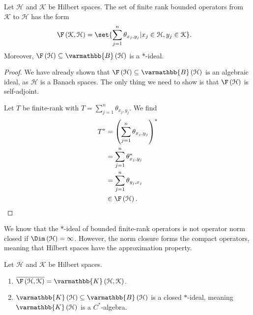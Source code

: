 \documentclass[10pt]{mypackage}
\renewcommand*{\mathbb}[1]{\varmathbb{#1}}
\newcommand{\B}{\mathbb{B}}
\begin{document}
\begin{corollary}
  Let $\mathcal{H}$ and $\mathcal{K}$ be Hilbert spaces. The set of finite rank bounded operators from $\mathcal{K}$ to $\mathcal{H}$ has the form
  \begin{align*}
    \F\left(\mathcal{K},\mathcal{H}\right) &= \set{\sum_{j=1}^{n}\theta_{x_j,y_j} | x_j\in \mathcal{H},y_j\in \mathcal{K}}.
  \end{align*}
  Moreover, $\F\left(\mathcal{H}\right)\subseteq \B\left(\mathcal{H}\right)$ is a $\ast$-ideal.
\end{corollary}
\begin{proof}
  We have already shown that $\F\left(\mathcal{H}\right)\subseteq \B\left(\mathcal{H}\right)$ is an algebraic ideal, as $\mathcal{H}$ is a Banach spaces. The only thing we need to show is that $\F\left(\mathcal{H}\right)$ is self-adjoint.\newline

  Let $T$ be finite-rank with $T = \sum_{j=1}^{n}\theta_{x_j,y_j}$. We find
  \begin{align*}
    T^{\ast} &= \left(\sum_{j=1}^{n}\theta_{x_j,y_j}\right)^{\ast}\\
             &= \sum_{j=1}^{n}\theta_{x_j,y_j}^{\ast}\\
             &= \sum_{j=1}^{n}\theta_{y_j,x_j}\\
             &\in \F\left(\mathcal{H}\right).
  \end{align*}
\end{proof}
We know that the $\ast$-ideal of bounded finite-rank operators is not operator norm closed if $\Dim\left(\mathcal{H}\right) = \infty$. However, the norm closure forms the compact operators, meaning that Hilbert spaces have the approximation property.
\begin{theorem}
  Let $\mathcal{H}$ and $\mathcal{K}$ be Hilbert spaces.
  \begin{enumerate}[(1)]
    \item $\overline{\F\left(\mathcal{H},\mathcal{K}\right)} = \mathbb{K}\left(\mathcal{H},\mathcal{K}\right)$.
    \item $\mathbb{K}\left(\mathcal{H}\right)\subseteq \B\left(\mathcal{H}\right)$ is a closed $\ast$-ideal, meaning $\mathbb{K}\left(\mathcal{H}\right)$ is a $C^{\ast}$-algebra.
  \end{enumerate}
\end{theorem}
\end{document}
